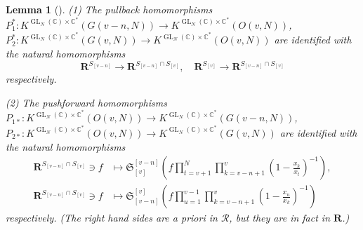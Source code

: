 \documentclass[12pt]{amsart}
\def\Bbb{\mathbb}
\newcommand{\rom}{\textup}
\newtheorem{Lemma}[equation]{Lemma}
\theoremstyle{definition}
\theoremstyle{remark}
\numberwithin{equation}{subsection}
\newcommand{\C}{{\Bbb C}}
\newcommand{\GL}{\operatorname{GL}}
\begin{document}
\begin{Lemma}[]\label{lem:Vass3}
\rom{(1)} The pullback homomorphisms
$P_1^*\colon K^{\GL_N(\C)\times\C^*}(G(v-n,N))\to
K^{\GL_N(\C)\times\C^*}(O(v,N))$, $P_2^*\colon
K^{\GL_N(\C)\times\C^*}(G(v,N))\to K^{\GL_N(\C)\times\C^*}(O(v,N))$
are identified with the natural homomorphisms
\begin{equation*}
  \mathbf R^{S_{[v-n]}} \to 
  \mathbf R^{S_{[v-n]}\cap S_{[v]}}, \quad
  \mathbf R^{S_{[v]}} \to 
  \mathbf R^{S_{[v-n]}\cap S_{[v]}}
\end{equation*}
respectively.

\rom{(2)} The pushforward homomorphisms
$P_{1*}\colon K^{\GL_N(\C)\times\C^*}(O(v,N))\to
K^{\GL_N(\C)\times\C^*}(G(v-n,N))$, $P_{2*}\colon
K^{\GL_N(\C)\times\C^*}(O(v,N))\to K^{\GL_N(\C)\times\C^*}(G(v,N))$
are identified with the natural homomorphisms
\begin{equation*}
\begin{split}
  \mathbf R^{S_{[v-n]}\cap S_{[v]}} \ni f & \mapsto
  {\mathfrak S}_{[v]}^{[v-n]}
  \left(f \prod_{t=v+1}^{N}\prod_{k=v-n+1}^v
    ( 1 - \frac{x_k}{x_t})^{-1}\right), \\
  \mathbf R^{S_{[v-n]}\cap S_{[v]}} \ni f & \mapsto
  {\mathfrak S}_{[v-n]}^{[v]}
  \left(f \prod_{u=1}^{v-1}\prod_{k=v-n+1}^v
    ( 1 - \frac{x_u}{x_k})^{-1}\right)
\end{split}
\end{equation*}
respectively.
\rom(The right hand sides are a priori in ${\mathcal R}$, but they are
in fact in $\mathbf R$.\rom)
\end{Lemma}
\end{document}
